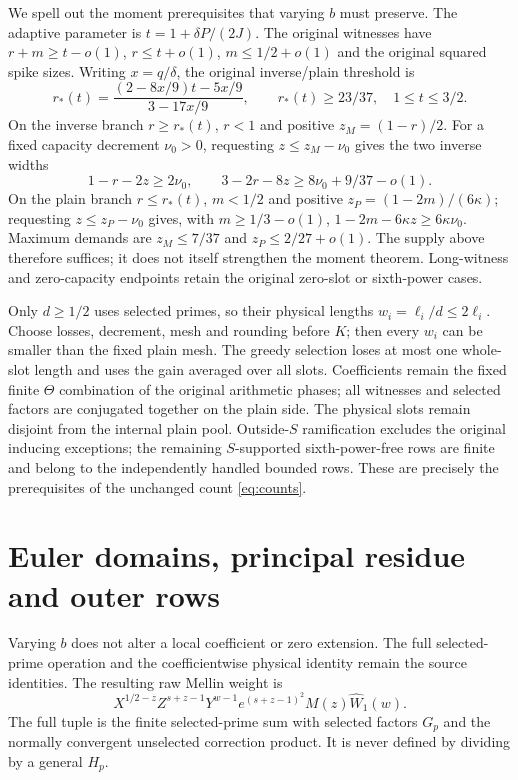 \documentclass[11pt,a4paper]{article}
\theoremstyle{definition}
\begin{document}
We spell out the moment prerequisites that varying $b$ must preserve.
The adaptive parameter is $t=1+\delta P/(2J)$.
The original witnesses have $r+m\ge t-o(1)$, $r\le t+o(1)$,
$m\le1/2+o(1)$ and the original squared spike sizes.
Writing $x=q/\delta$, the original inverse/plain threshold is
\[
 r_*(t)=\frac{(2-8x/9)t-5x/9}{3-17x/9},
 \qquad r_*(t)\ge23/37,\quad 1\le t\le3/2 .
\]
On the inverse branch $r\ge r_*(t)$, $r<1$ and positive
$z_M=(1-r)/2$. For a fixed capacity decrement $\nu_0>0$, requesting
$z\le z_M-\nu_0$ gives the two inverse widths
\[
 1-r-2z\ge2\nu_0,\qquad
 3-2r-8z\ge8\nu_0+9/37-o(1).
\]
On the plain branch $r\le r_*(t)$, $m<1/2$ and positive
$z_P=(1-2m)/(6\kappa)$; requesting $z\le z_P-\nu_0$ gives,
with $m\ge1/3-o(1)$,
$1-2m-6\kappa z\ge6\kappa\nu_0$.
Maximum demands are $z_M\le7/37$ and $z_P\le2/27+o(1)$.
The supply above therefore suffices; it does not itself strengthen
the moment theorem.
Long-witness and zero-capacity endpoints retain the original
zero-slot or sixth-power cases.

Only $d\ge1/2$ uses selected primes, so their physical lengths
$w_i=\ell_i/d\le2\ell_i$.
Choose losses, decrement, mesh and rounding before $K$;
then every $w_i$ can be smaller than the fixed plain mesh.
The greedy selection loses at most one whole-slot length and
uses the gain averaged over all slots.
Coefficients remain the fixed finite $\Theta$ combination of the
original arithmetic phases; all witnesses and selected factors
are conjugated together on the plain side.
The physical slots remain disjoint from the internal plain pool.
Outside-$S$ ramification excludes the original inducing exceptions;
the remaining $S$-supported sixth-power-free rows are finite and
belong to the independently handled bounded rows.
These are precisely the prerequisites of the unchanged count
\eqref{eq:counts}.

\section{Euler domains, principal residue and outer rows}
\label{sec:contours}
Varying $b$ does not alter a local coefficient or zero extension.
The full selected-prime operation and the coefficientwise
physical identity remain the source identities.
The resulting raw Mellin weight is
\[
 X^{1/2-z}Z^{s+z-1}Y^{w-1}e^{(s+z-1)^2}
 M(z)\widehat W_1(w).
\]
The full tuple is the finite selected-prime sum with selected
factors $G_p$ and the normally convergent unselected correction
product. It is never defined by dividing by a general $H_p$.
\end{document}

